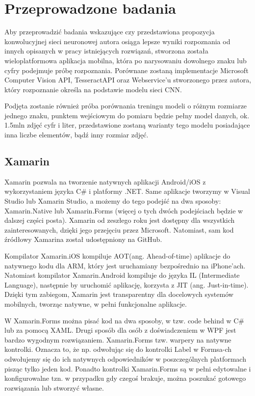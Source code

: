 \documentclass[brudnopis]{xmgr}
\begin{document}
\chapter{Przeprowadzone badania}

Aby przeprowadzić badania wskazujące czy przedstawiona propozycja konwolucyjnej sieci neuronowej autora osiąga lepsze wyniki rozpoznania od innych opisanych w pracy istniejących rozwiązań, stworzona została wieloplatformowa aplikacja mobilna, która po narysowaniu dowolnego znaku lub cyfry podejmuje próbę rozpoznania.
Porównane zostaną implementacje Microsoft Computer Vision API, TesseractAPI oraz Webservice'u stworzonego przez autora, który rozpoznanie określa na podstawie modelu sieci CNN.

Podjęta zostanie również próba porównania treningu modeli o różnym rozmiarze jednego znaku, punktem wejściowym do pomiaru będzie pełny model danych, ok. 1.5mln zdjęć cyfr i liter, przedstawione zostaną warianty tego modelu posiadające inna liczbe elementów, bądź inny rozmiar zdjęć.

\section{Xamarin}

Xamarin pozwala na tworzenie natywnych aplikacji Android/iOS z wykorzystaniem języka C\# i platformy .NET. Same aplikacje tworzymy w Visual Studio lub Xamarin Studio, a możemy do tego podejść na dwa sposoby: Xamarin.Native lub Xamarin.Forms (więcej o tych dwóch podejściach będzie w dalszej części posta). Xamarin od zeszłego roku jest dostępny dla wszystkich zainteresowanych, dzięki jego przejęciu przez Microsoft. Natomiast, sam kod źródłowy Xamarina został udostępniony na GitHub.

Kompilator Xamarin.iOS kompiluje AOT(ang. Ahead-of-time) aplikacje do natywnego kodu dla ARM, który jest uruchamiany bezpośrednio na iPhone’ach.
Natomiast kompilator Xamarin.Android kompiluje do języka IL (Intermediate Language), następnie by uruchomić aplikację, korzysta z JIT (ang. Just-in-time).
Dzięki tym zabiegom, Xamarin jest transparentny dla docelowych systemów mobilnych, tworząc natywne, w pełni funkcjonalne aplikacje.

W Xamarin.Forms można pisać kod na dwa sposoby, w tzw. code behind w C\# lub za pomocą XAML. Drugi sposób dla osób z doświadczeniem w WPF jest bardzo wygodnym rozwiązaniem. Xamarin.Forms tzw. warpery na natywne kontrolki. Oznacza to, że np. odwołując się do kontrolki Label w Formsa-ch odwołujemy się do ich natywnych odpowiedników w poszczególnych platformach pisząc tylko jeden kod. Ponadto kontrolki Xamarin.Forms są w pełni edytowalne i konfigurowalne tzn. w przypadku gdy czegoś brakuje, można poszukać gotowego rozwiązania lub stworzyć własne.
\end{document}
